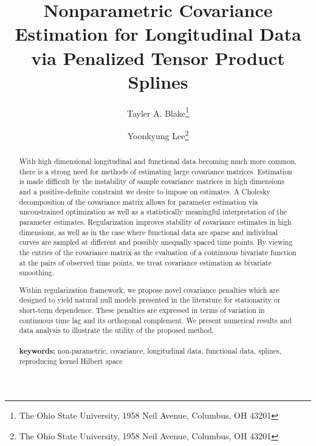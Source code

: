 \documentclass[12pt]{article}
\theoremstyle{definition}
\def\bL{\mathbf{L}}
\begin{document}
\def\bL{\mathbf{L}}


\title{ Nonparametric Covariance Estimation for Longitudinal Data via Penalized Tensor Product Splines}

\author{Tayler A. Blake\thanks{The Ohio State University, 1958 Neil Avenue, Columbus, OH 43201} \and  Yoonkyung Lee\thanks{The Ohio State University, 1958 Neil Avenue, Columbus, OH 43201}}


\maketitle

\begin{abstract}
With high dimensional longitudinal and functional data becoming much more common, there is a strong need for methods of estimating large covariance matrices. Estimation is made difficult  by the instability of sample covariance matrices in high dimensions and a positive-definite constraint we desire to impose on estimates. A Cholesky decomposition of the covariance matrix allows for parameter estimation via unconstrained optimization as well as a statistically meaningful interpretation of the parameter estimates. Regularization improves stability of covariance estimates in high dimensions, as well as in the case where functional data are sparse and individual curves are sampled at different and possibly unequally spaced time points. By viewing the entries of the covariance matrix as the evaluation of a continuous bivariate function at the pairs of observed time points, we treat covariance estimation as bivariate smoothing. 

\bigskip

Within regularization framework, we propose novel covariance penalties which are designed to yield natural null models presented in the literature for stationarity or short-term dependence. These penalties are expressed in terms of variation in continuous time lag and its orthogonal complement. We present numerical results and data analysis to illustrate the utility of the proposed method. \\
\\
{\bf keywords:} non-parametric, covariance, longitudinal data, functional data, splines, reproducing kernel Hilbert space
\end{abstract}
\end{document}
